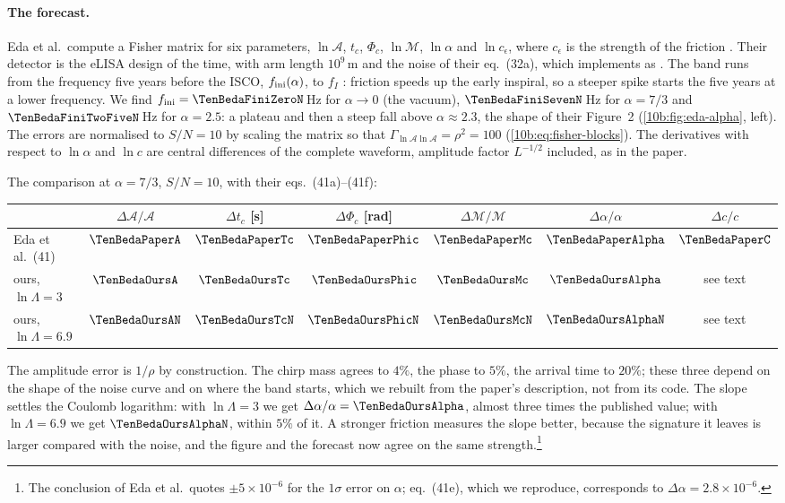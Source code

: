 \paragraph{The forecast.} Eda et al.\ compute a Fisher matrix for six parameters, $\ln\mathcal A$, $t_c$, $\Phi_c$,
$\ln\mathcal M$, $\ln\alpha$ and $\ln c_\epsilon$, where $c_\epsilon$ is the strength of the friction \cite[eqs.~(37)--(38)]{Eda2015}.
Their detector is the eLISA design of the time, with arm length $10^9$\,m and the noise of their eq.~(32a), which
 implements as . The band runs from the frequency five years before the ISCO,
$f_{\rm ini}(\alpha)$, to $f_I$ \cite[eq.~(40)]{Eda2015}: friction speeds up the early inspiral, so a steeper spike
starts the five years at a lower frequency. We find $f_{\rm ini}=\TenBedaFiniZeroN$\,Hz for $\alpha\to0$ (the vacuum),
$\TenBedaFiniSevenN$\,Hz for $\alpha=7/3$ and $\TenBedaFiniTwoFiveN$\,Hz for $\alpha=2.5$: a plateau and then a steep fall
above $\alpha\approx2.3$, the shape of their Figure~2 (\cref{10b:fig:eda-alpha}, left). The errors are normalised to
$S/N=10$ by scaling the matrix so that $\Gamma_{\ln\mathcal A\ln\mathcal A}=\rho^2=100$
(\cref{10b:eq:fisher-blocks}). The derivatives with respect to $\ln\alpha$ and $\ln c$ are central differences of the
complete waveform, amplitude factor $L^{-1/2}$ included, as in the paper.

The comparison at $\alpha=7/3$, $S/N=10$, with their eqs.~(41a)--(41f):
\begin{center}
\small
\begin{tabular}{@{}lcccccc@{}}
\toprule
& $\Delta\mathcal A/\mathcal A$ & $\Delta t_c$ [s] & $\Delta\Phi_c$ [rad] & $\Delta\mathcal M/\mathcal M$ & $\Delta\alpha/\alpha$ & $\Delta c/c$\\\midrule
Eda et al.\ (41) & $\TenBedaPaperA$ & $\TenBedaPaperTc$ & $\TenBedaPaperPhic$ & $\TenBedaPaperMc$ & $\TenBedaPaperAlpha$ & $\TenBedaPaperC$\\
ours, $\ln\Lambda=3$ & $\TenBedaOursA$ & $\TenBedaOursTc$ & $\TenBedaOursPhic$ & $\TenBedaOursMc$ & $\TenBedaOursAlpha$ & see text\\
ours, $\ln\Lambda=6.9$ & $\TenBedaOursAN$ & $\TenBedaOursTcN$ & $\TenBedaOursPhicN$ & $\TenBedaOursMcN$ & $\TenBedaOursAlphaN$ & see text\\
\bottomrule
\end{tabular}
\end{center}
The amplitude error is $1/\rho$ by construction. The chirp mass agrees to $4\%$, the phase to $5\%$, the arrival time
to $20\%$; these three depend on the shape of the noise curve and on where the band starts, which we rebuilt from the
paper's description, not from its code. The slope settles the Coulomb logarithm: with $\ln\Lambda=3$ we get
$\Delta\alpha/\alpha=\TenBedaOursAlpha$, almost three times the published value; with $\ln\Lambda=6.9$ we get
$\TenBedaOursAlphaN$, within $5\%$ of it. A stronger friction measures the slope better, because the signature it
leaves is larger compared with the noise, and the figure and the forecast now agree on the same strength.\footnote{The
conclusion of Eda et al.\ quotes $\pm5\times10^{-6}$ for the $1\sigma$ error on $\alpha$; eq.~(41e), which we
reproduce, corresponds to $\Delta\alpha=2.8\times10^{-6}$.}

